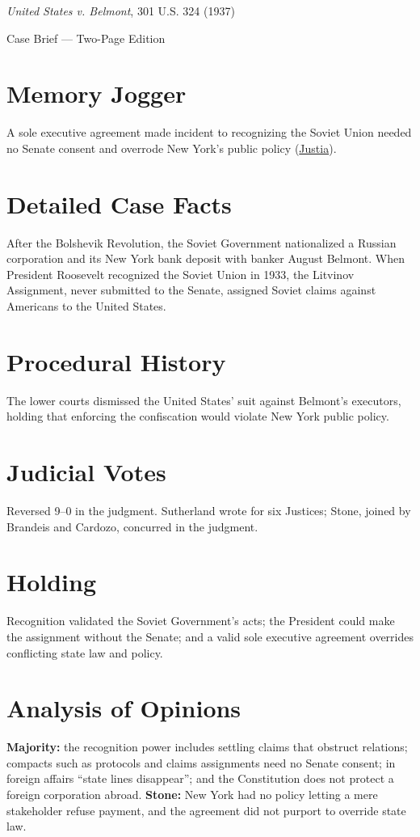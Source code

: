 \documentclass[12pt]{article}
\begin{document}
\begin{center}
{\LARGE \textit{United States v. Belmont}, 301 U.S. 324 (1937)\par}
\vspace{0.5em}
{\large Case Brief --- Two-Page Edition\par}
\end{center}

\section{Memory Jogger}
A sole executive agreement made incident to recognizing the Soviet Union needed no Senate consent and overrode New York's public policy (\href{https://supreme.justia.com/cases/federal/us/301/324/}{Justia}).

\section{Detailed Case Facts}
After the Bolshevik Revolution, the Soviet Government nationalized a Russian corporation and its New York bank deposit with banker August Belmont. When President Roosevelt recognized the Soviet Union in 1933, the Litvinov Assignment, never submitted to the Senate, assigned Soviet claims against Americans to the United States.

\section{Procedural History}
The lower courts dismissed the United States' suit against Belmont's executors, holding that enforcing the confiscation would violate New York public policy.

\section{Judicial Votes}
Reversed 9--0 in the judgment. Sutherland wrote for six Justices; Stone, joined by Brandeis and Cardozo, concurred in the judgment.

\section{Holding}
Recognition validated the Soviet Government's acts; the President could make the assignment without the Senate; and a valid sole executive agreement overrides conflicting state law and policy.

\section{Analysis of Opinions}
\textbf{Majority:} the recognition power includes settling claims that obstruct relations; compacts such as protocols and claims assignments need no Senate consent; in foreign affairs ``state lines disappear''; and the Constitution does not protect a foreign corporation abroad. \textbf{Stone:} New York had no policy letting a mere stakeholder refuse payment, and the agreement did not purport to override state law.
\end{document}

